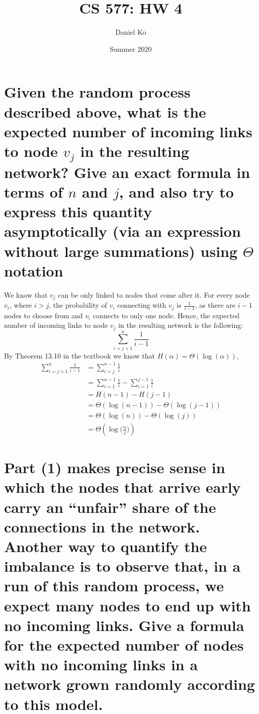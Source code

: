 \documentclass[11pt]{scrartcl}
\title{CS 577: HW 4}
\author{Daniel Ko}
\date{Summer 2020}
\begin{document}
\maketitle

\section{
Given the random process described above, what is the expected number of
incoming links to node $v_j$ in the resulting network? Give an exact formula in terms of $n$ and $j$,
and also try to express this quantity asymptotically (via an expression without large summations)
using $\Theta$ notation
}

We know that $v_j$ can be only linked to nodes that come after it. 
For every node $v_i$, where $i > j$, the probability of $v_i$
connecting with $v_j$ is $\frac{1}{i-1}$, as there are $i-1$ nodes to choose from and $v_i$
connects to only one node. Hence, the expected number of
incoming links to node $v_j$ in the resulting network is the following:
$$
\sum_{i = j+1}^n \frac{1}{i-1}
$$
By Theorem 13.10 in the textbook we know that $H(\alpha) = \Theta(\log (\alpha))$,
\begin{align*}
	\sum_{i = j+1}^n \frac{1}{i-1} & = \sum_{i = j}^{n-1} \frac{1}{i} \\
	& = \sum_{i = 1}^{n-1} \frac{1}{i} - \sum_{i = 1}^{j-1} \frac{1}{i}\\
	& = H(n-1) - H(j-1)\\
	& = \Theta(\log(n-1)) - \Theta(\log(j-1))\\
	& =  \Theta(\log(n)) - \Theta(\log(j))\\
	& = \Theta(\log\Big(\frac{n}{j}\Big))
\end{align*}

\section{
Part (1) makes precise sense in which the nodes that arrive early carry an “unfair”
share of the connections in the network. Another way to quantify the imbalance is to observe
that, in a run of this random process, we expect many nodes to end up with no incoming links.
Give a formula for the expected number of nodes with no incoming links in a network grown
randomly according to this model.
}
\end{document}
